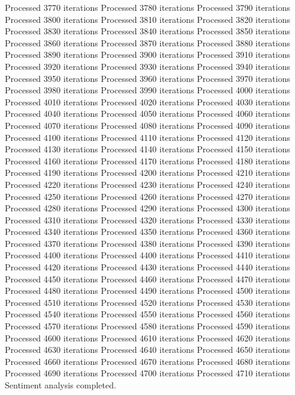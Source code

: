 \begin{pyprint}
Processed 3770 iterations
Processed 3780 iterations
Processed 3790 iterations
Processed 3800 iterations
Processed 3810 iterations
Processed 3820 iterations
Processed 3830 iterations
Processed 3840 iterations
Processed 3850 iterations
Processed 3860 iterations
Processed 3870 iterations
Processed 3880 iterations
Processed 3890 iterations
Processed 3900 iterations
Processed 3910 iterations
Processed 3920 iterations
Processed 3930 iterations
Processed 3940 iterations
Processed 3950 iterations
Processed 3960 iterations
Processed 3970 iterations
Processed 3980 iterations
Processed 3990 iterations
Processed 4000 iterations
Processed 4010 iterations
Processed 4020 iterations
Processed 4030 iterations
Processed 4040 iterations
Processed 4050 iterations
Processed 4060 iterations
Processed 4070 iterations
Processed 4080 iterations
Processed 4090 iterations
Processed 4100 iterations
Processed 4110 iterations
Processed 4120 iterations
Processed 4130 iterations
Processed 4140 iterations
Processed 4150 iterations
Processed 4160 iterations
Processed 4170 iterations
Processed 4180 iterations
Processed 4190 iterations
Processed 4200 iterations
Processed 4210 iterations
Processed 4220 iterations
Processed 4230 iterations
Processed 4240 iterations
Processed 4250 iterations
Processed 4260 iterations
Processed 4270 iterations
Processed 4280 iterations
Processed 4290 iterations
Processed 4300 iterations
Processed 4310 iterations
Processed 4320 iterations
Processed 4330 iterations
Processed 4340 iterations
Processed 4350 iterations
Processed 4360 iterations
Processed 4370 iterations
Processed 4380 iterations
Processed 4390 iterations
Processed 4400 iterations
Processed 4400 iterations
Processed 4410 iterations
Processed 4420 iterations
Processed 4430 iterations
Processed 4440 iterations
Processed 4450 iterations
Processed 4460 iterations
Processed 4470 iterations
Processed 4480 iterations
Processed 4490 iterations
Processed 4500 iterations
Processed 4510 iterations
Processed 4520 iterations
Processed 4530 iterations
Processed 4540 iterations
Processed 4550 iterations
Processed 4560 iterations
Processed 4570 iterations
Processed 4580 iterations
Processed 4590 iterations
Processed 4600 iterations
Processed 4610 iterations
Processed 4620 iterations
Processed 4630 iterations
Processed 4640 iterations
Processed 4650 iterations
Processed 4660 iterations
Processed 4670 iterations
Processed 4680 iterations
Processed 4690 iterations
Processed 4700 iterations
Processed 4710 iterations
Sentiment analysis completed.
\end{pyprint}
